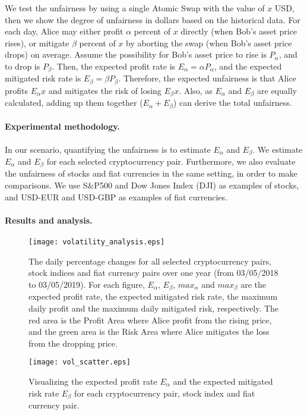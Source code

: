 We test the unfairness by using a single Atomic Swap with the value of $x$ USD, then we show the degree of unfairness in dollars based on the historical data.
For each day, Alice may either profit $\alpha$ percent of $x$ directly (when Bob's asset price rises),
or mitigate $\beta$ percent of $x$ by aborting the swap (when Bob's asset price drops) on average.
Assume the possibility for Bob's asset price to rise is $P_{\alpha}$, and to drop is $P_{\beta}$.
Then, the expected profit rate is $E_{\alpha} = \alpha P_{\alpha}$,
and the expected mitigated risk rate is $E_{\beta} = \beta P_{\beta}$.
Therefore, the expected unfairness is that Alice profits $E_{\alpha} x$ and mitigates the risk of losing $E_{\beta} x$.
Also, as $E_\alpha$ and $E_\beta$ are equally calculated, adding up them together ($E_\alpha + E_\beta$) can derive the total unfairness.

\paragraph{Experimental methodology.}
In our scenario, quantifying the unfairness is to estimate $E_{\alpha}$ and $E_{\beta}$.
We estimate $E_{\alpha}$ and $E_{\beta}$ for each selected cryptocurrency pair.
Furthermore,  we also evaluate the unfairness of stocks and fiat currencies in the same setting, in order to make comparisons.
We use S\&P500 and Dow Jones Index (DJI) as examples of stocks, and USD-EUR and USD-GBP as examples of fiat currencies.

\paragraph{Results and analysis.}

\begin{figure*}
    \texttt{[image: volatility\_analysis.eps]}
    \caption{The daily percentage changes for all selected cryptocurrency pairs, stock indices and fiat currency pairs over one year (from 03/05/2018 to 03/05/2019).
    For each figure, $E_{\alpha}$, $E_{\beta}$, $max_\alpha$ and $max_\beta$ are the expected profit rate, the expected mitigated risk rate, the maximum daily profit and the maximum daily mitigated risk, respectively.
    The red area is the Profit Area where Alice profit from the rising price, and the green area is the Risk Area where Alice mitigates the loss from the dropping price.}
    \label{fig:volatility_analysis}
\end{figure*}

\begin{figure}
    \texttt{[image: vol\_scatter.eps]}
    \caption{Visualizing the expected profit rate $E_\alpha$ and the expected mitigated risk rate $E_\beta$ for each cryptocurrency pair, stock index and fiat currency pair.}
    \label{fig:vol_scatter}
\end{figure}

